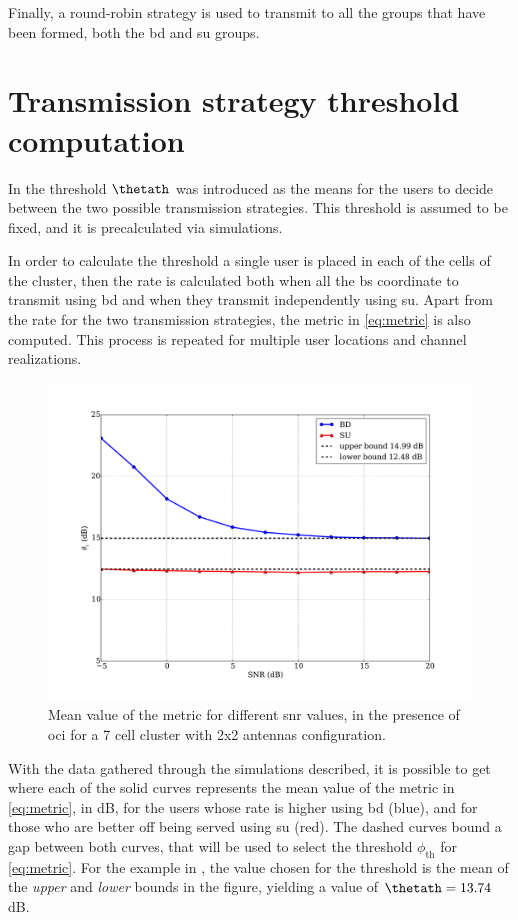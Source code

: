Finally, a round-robin strategy is used to transmit to all the groups that have
been formed, both the \gls{bd} and \gls{su} groups.

\section{Transmission strategy threshold computation}
\label{ssec:sched_threshold}

In  the threshold $\thetath$ was introduced as the
means for the users to decide between the two possible transmission strategies.
This threshold is assumed to be fixed, and it is precalculated via simulations.

In order to calculate the threshold a single user is placed in each of the cells
of the cluster, then the rate is calculated both when all the \gls{bs}
coordinate to transmit using \gls{bd} and when they transmit independently using
\gls{su}. Apart from the rate for the two transmission strategies, the metric in
\eqref{eq:metric} is also computed. This process is repeated for multiple user
locations and channel realizations.

\begin{figure}[t]
    \centering
    \includegraphics[width=0.75\columnwidth]{./12.simple_threshold_scheduling/figure/mean_metric_02x02}
    \caption{Mean value of the metric for different \gls{snr} values, in the
    presence of \gls{oci} for a 7 cell cluster with 2x2 antennas configuration.}
    \label{fig:threshold_2x2}
\end{figure}

With the data gathered through the simulations described, it is possible to get
 where each of the solid curves represents the mean
value of the metric in \eqref{eq:metric}, in dB, for the users whose rate is
higher using \gls{bd} (blue), and for those who are better off being served
using \gls{su} (red). The dashed curves bound a gap between both curves, that
will be used to select the threshold $\phi_{\text{th}}$ for \eqref{eq:metric}.
For the example in , the value chosen for the threshold
is the mean of the \emph{upper} and \emph{lower} bounds in the figure, yielding
a value of $\thetath = 13.74$\,dB.

